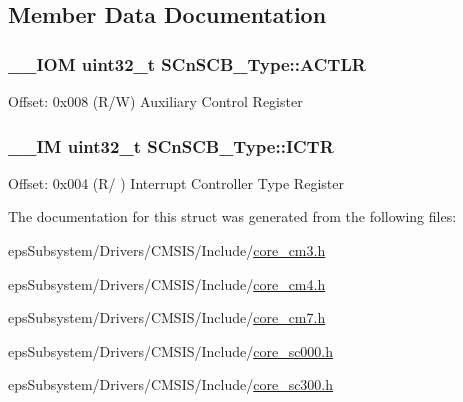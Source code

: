 \subsection{Member Data Documentation}
\hypertarget{struct_s_cn_s_c_b___type_a13af9b718dde7481f1c0344f00593c23}{
\subsubsection[{A\-C\-T\-L\-R}]{\setlength{\rightskip}{0pt plus 5cm}\-\_\-\-\_\-\-I\-O\-M uint32\-\_\-t S\-Cn\-S\-C\-B\-\_\-\-Type\-::\-A\-C\-T\-L\-R}}\label{struct_s_cn_s_c_b___type_a13af9b718dde7481f1c0344f00593c23}
Offset\-: 0x008 (R/\-W) Auxiliary Control Register \hypertarget{struct_s_cn_s_c_b___type_a34ec1d771245eb9bd0e3ec9336949762}{
\subsubsection[{I\-C\-T\-R}]{\setlength{\rightskip}{0pt plus 5cm}\-\_\-\-\_\-\-I\-M uint32\-\_\-t S\-Cn\-S\-C\-B\-\_\-\-Type\-::\-I\-C\-T\-R}}\label{struct_s_cn_s_c_b___type_a34ec1d771245eb9bd0e3ec9336949762}
Offset\-: 0x004 (R/ ) Interrupt Controller Type Register 

The documentation for this struct was generated from the following files\-:\begin{DoxyCompactItemize}
\item 
eps\-Subsystem/\-Drivers/\-C\-M\-S\-I\-S/\-Include/\hyperlink{core__cm3_8h}{core\-\_\-cm3.\-h}\item 
eps\-Subsystem/\-Drivers/\-C\-M\-S\-I\-S/\-Include/\hyperlink{core__cm4_8h}{core\-\_\-cm4.\-h}\item 
eps\-Subsystem/\-Drivers/\-C\-M\-S\-I\-S/\-Include/\hyperlink{core__cm7_8h}{core\-\_\-cm7.\-h}\item 
eps\-Subsystem/\-Drivers/\-C\-M\-S\-I\-S/\-Include/\hyperlink{core__sc000_8h}{core\-\_\-sc000.\-h}\item 
eps\-Subsystem/\-Drivers/\-C\-M\-S\-I\-S/\-Include/\hyperlink{core__sc300_8h}{core\-\_\-sc300.\-h}\end{DoxyCompactItemize}

